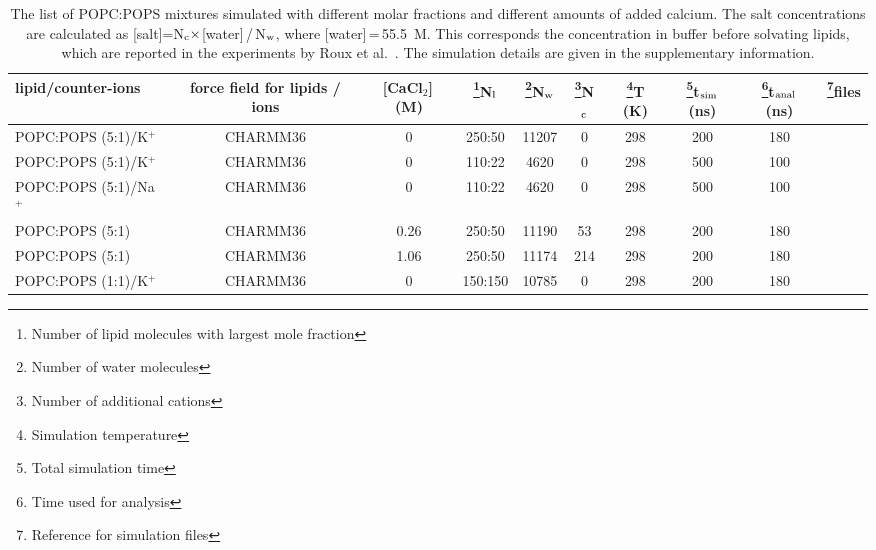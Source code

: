\documentclass[aps,prl,superscriptaddress,twocolumn]{revtex4}
\begin{document}
\begin{table}[tb]
\centering
\caption{The list of POPC:POPS mixtures simulated with different molar fractions and different amounts of added calcium. 
  The salt concentrations are calculated as [salt]=N$_{\rm c} \times$[water]\,/\,N$_{\rm w}$, where [water]\,=\,55.5~M.
  This corresponds the concentration in buffer before solvating lipids, which are
  reported in the experiments by Roux et al.~\cite{roux90}.
  The simulation details are given in the supplementary information.
}\label{mixedIONsystems}
\begin{tabular}{l c c c c c c c c c }
  lipid/counter-ions & force field for lipids / ions & [CaCl$_2$]\,(M)  &  \footnote{Number of lipid molecules with largest mole fraction}N$_{\rm l}$   &  \footnote{Number of water molecules}N$_{\rm w}$   & \footnote{Number of additional cations}N$_{\rm c}$  & \footnote{Simulation temperature}T (K)  & \footnote{Total simulation time}t$_{{\rm sim}}$(ns) & \footnote{Time used for analysis}t$_{{\rm anal}}$ (ns) &   \footnote{Reference for simulation files}files\\
  \hline
    POPC:POPS (5:1)/K$^+$  & CHARMM36 \cite{klauda10,venable13} &0 & 250:50 & 11207 & 0  & 298  & 200 & 180   & \cite{POPC5POPS1noCaClCHARMM}  \\
    POPC:POPS (5:1)/K$^+$  & CHARMM36 \cite{klauda10,venable13} &0 & 110:22 & 4620  & 0  & 298  & 500 & 100 & \cite{charmm36pops+83popcT298Kpiggot}  \\
    POPC:POPS (5:1)/Na$^+$ & CHARMM36 \cite{klauda10,venable13} &0 & 110:22 & 4620  & 0  & 298  & 500 & 100 & \cite{charmm36pops+83popcT298KpiggotSODIUM}  \\
    POPC:POPS (5:1)        & CHARMM36 \cite{klauda10,venable13,kim16}  & 0.26 & 250:50  & 11190  & 53  & 298  & 200 & 180 & \cite{POPC5POPS1withCaClCHARMM}   \\
    POPC:POPS (5:1)        & CHARMM36 \cite{klauda10,venable13,kim16}  & 1.06 & 250:50  & 11174  & 214  & 298  & 200 & 180  & \cite{POPC5POPS1with1MCaClCHARMM}  \\
    POPC:POPS (1:1)/K$^+$  & CHARMM36 \cite{klauda10,venable13}        & 0    & 150:150 & 10785    & 0  & 298  & 200 & 180   & \cite{POPC1POPS1noCaClCHARMM}  \\

\end{tabular}
\end{table}
\end{document}
